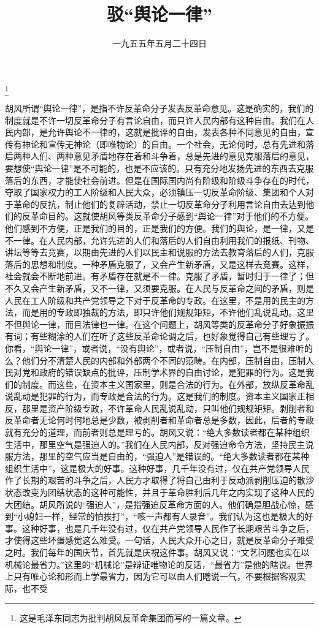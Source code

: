 
\title{驳“舆论一律”}
\date{一九五五年五月二十四日}
\thanks{这是毛泽东同志为批判胡风反革命集团而写的一篇文章。}
\maketitle


胡风所谓“舆论一律”，是指不许反革命分子发表反革命意见。这是确实的，我们的制度就是不许一切反革命分子有言论自由，而只许人民内部有这种自由。我们在人民内部，是允许舆论不一律的，这就是批评的自由，发表各种不同意见的自由，宣传有神论和宣传无神论（即唯物论）的自由。一个社会，无论何时，总有先进和落后两种人们、两种意见矛盾地存在着和斗争着，总是先进的意见克服落后的意见，要想使“舆论一律”是不可能的，也是不应该的。只有充分地发扬先进的东西去克服落后的东西，才能使社会前进。但是在国际国内尚有阶级和阶级斗争存在的时代，夺取了国家权力的工人阶级和人民大众，必须镇压一切反革命阶级、集团和个人对于革命的反抗，制止他们的复辟活动，禁止一切反革命分子利用言论自由去达到他们的反革命目的。这就使胡风等类反革命分子感到“舆论一律”对于他们的不方便。他们感到不方便，正是我们的目的，正是我们的方便。我们的舆论，是一律，又是不一律。在人民内部，允许先进的人们和落后的人们自由利用我们的报纸、刊物、讲坛等等去竞赛，以期由先进的人们以民主和说服的方法去教育落后的人们，克服落后的思想和制度。一种矛盾克服了，又会产生新矛盾，又是这样去竞赛。这样，社会就会不断地前进。有矛盾存在就是不一律。克服了矛盾，暂时归于一律了；但不久又会产生新矛盾，又不一律，又须要克服。在人民与反革命之间的矛盾，则是人民在工人阶级和共产党领导之下对于反革命的专政。在这里，不是用的民主的方法，而是用的专政即独裁的方法，即只许他们规规矩矩，不许他们乱说乱动。这里不但舆论一律，而且法律也一律。在这个问题上，胡风等类的反革命分子好象振振有词；有些糊涂的人们在听了这些反革命论调之后，也好象觉得自己有些理亏了。你看，“舆论一律”，或者说，“没有舆论”，或者说，“压制自由”，岂不是很难听的么？他们分不清楚人民的内部和外部两个不同的范畴。在内部，压制自由，压制人民对党和政府的错误缺点的批评，压制学术界的自由讨论，是犯罪的行为。这是我们的制度。而这些，在资本主义国家里，则是合法的行为。在外部，放纵反革命乱说乱动是犯罪的行为，而专政是合法的行为。这是我们的制度。资本主义国家正相反，那里是资产阶级专政，不许革命人民乱说乱动，只叫他们规规矩矩。剥削者和反革命者无论何时何地总是少数，被剥削者和革命者总是多数，因此，后者的专政就有充分的道理，而前者则总是理亏的。胡风又说：“绝大多数读者都在某种组织生活中，那里空气是强迫人的。”我们在人民内部，反对强迫命令方法，坚持民主说服方法，那里的空气应当是自由的，“强迫人”是错误的。“绝大多数读者都在某种组织生活中”，这是极大的好事。这种好事，几千年没有过，仅在共产党领导人民作了长期的艰苦的斗争之后，人民方才取得了将自己由利于反动派剥削压迫的散沙状态改变为团结状态的这种可能性，并且于革命胜利后几年之内实现了这种人民的大团结。胡风所说的“强迫人”，是指强迫反革命方面的人。他们确是胆战心惊，感到“小媳妇一样，经常的怕挨打”，“咳一声都有人录音”。我们认为这也是极大的好事。这种好事，也是几千年没有过，仅在共产党领导人民作了长期艰苦斗争之后，才使得这些坏蛋感觉这么难受。一句话，人民大众开心之日，就是反革命分子难受之时。我们每年的国庆节，首先就是庆祝这件事。胡风又说：“文艺问题也实在以机械论最省力。”这里的“机械论”是辩证唯物论的反话，“最省力”是他的瞎说。世界上只有唯心论和形而上学最省力，因为它可以由人们瞎说一气，不要根据客观实际，也不受